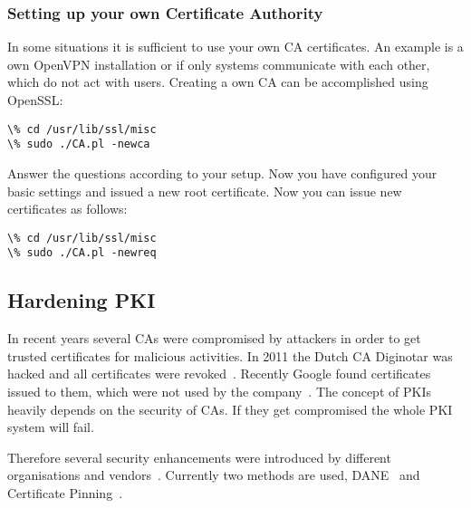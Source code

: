 \subsubsection{Setting up your own Certificate Authority}
\label{sec:setupownca}
In some situations it is sufficient to use your own CA certificates. An example is a own OpenVPN
installation or if only systems communicate with each other, which do not act with users. Creating
a own CA can be accomplished using OpenSSL:

\begin{lstlisting}
\% cd /usr/lib/ssl/misc
\% sudo ./CA.pl -newca
\end{lstlisting}

Answer the questions according to your setup. Now you have configured your basic settings and 
issued a new root certificate. Now you can issue new certificates as follows:

\begin{lstlisting}
\% cd /usr/lib/ssl/misc
\% sudo ./CA.pl -newreq
\end{lstlisting}

\subsection{Hardening PKI}
\label{sec:hardeningpki}
In recent years several CAs were compromised by attackers in order to
get trusted certificates for malicious activities. In 2011 the Dutch
CA Diginotar was hacked and all certificates were
revoked~\cite{diginotar-hack}. Recently Google found certificates
issued to them, which were not used by the
company~\cite{googlecahack}. The concept of PKIs heavily depends on the
security of CAs.  If they get compromised the whole PKI system will
fail.

Therefore several security enhancements were introduced by different
organisations and vendors~\cite{tschofenig-webpki}. Currently two
methods are used, DANE~\cite{rfc6698} and Certificate
Pinning~\cite{draft-ietf-websec-key-pinning}.





